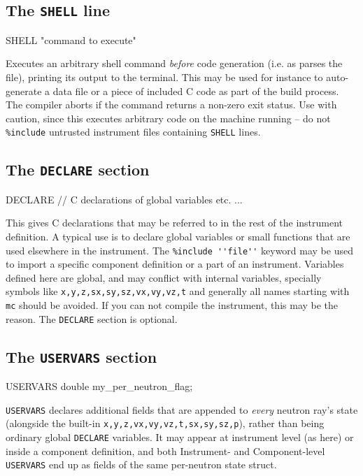 \subsection{The \texttt{SHELL} line}
\label{s:shell}
\begin{mcstas}
SHELL "command to execute"
\end{mcstas}
Executes an arbitrary shell command \emph{before} code generation (i.e. as
\mcs parses the file), printing its output to the terminal. This may be used
for instance to auto-generate a data file or a piece of included C code as
part of the build process. The compiler aborts if the command returns a
non-zero exit status. Use with caution, since this executes arbitrary code
on the machine running \mcs -- do not \texttt{\%include} untrusted instrument
files containing \texttt{SHELL} lines.

\subsection{The \texttt{DECLARE} section}
\label{s:declare}

\begin{mcstas}
DECLARE
   // C declarations of global variables etc. ...
\end{mcstas} 
 This gives C declarations that may be
referred to in the rest of the instrument definition. A typical use is to
declare global variables or small functions that are used elsewhere in the
instrument. The \verb+%include ''file''+ keyword may be used to import a
specific
component definition or a part of an instrument. Variables defined here are
global, and may conflict with internal \MCS variables, specially symbols like
\verb+x,y,z,sx,sy,sz,vx,vy,vz,t+ and generally all names starting with \verb+mc+
should be avoided. If you can not compile the instrument, this may be the
reason. The \texttt{DECLARE} section is optional.

\subsection{The \texttt{USERVARS} section}
\label{s:uservars}

\begin{mcstas}
USERVARS
  double my_per_neutron_flag;
\end{mcstas}
\texttt{USERVARS} declares additional fields that are appended to \emph{every}
neutron ray's state (alongside the built-in \texttt{x,y,z,vx,vy,vz,t,sx,sy,sz,p}),
rather than being ordinary global \texttt{DECLARE} variables. It may appear
at instrument level (as here) or inside a component definition, and both
Instrument- and Component-level \texttt{USERVARS} end up as fields of the
same per-neutron state struct.

